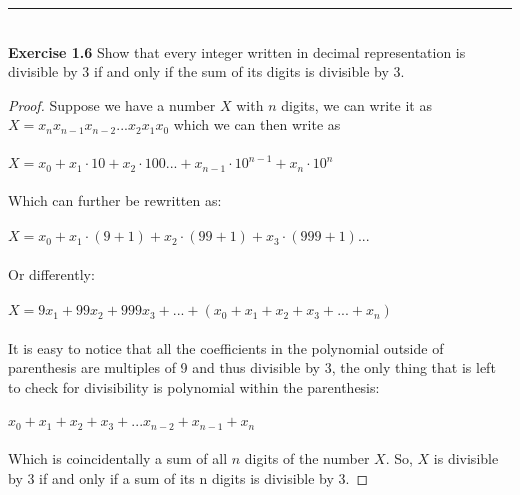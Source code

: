\documentclass{article}
\begin{document}
\noindent\rule{12cm}{0.4pt}\\
\noindent \textbf{Exercise 1.6} Show that every integer written in decimal representation is divisible by 3 if and only if the sum of its digits is divisible by 3.
\begin{proof}
Suppose we have a number $X$ with $n$ digits, we can write it as $X=x_n x_{n-1}x_{n-2}...x_2x_1x_0$ which we can then write as \\\\
 $X=x_0+x_1 \cdot 10 + x_2 \cdot 100 ... + x_{n-1} \cdot 10^{n-1} + x_n \cdot 10^n$ \\\\
 Which can further be rewritten as: \\\\
 $X = x_0 + x_1 \cdot (9 + 1) + x_2 \cdot (99 + 1) + x_3 \cdot (999 + 1)...$\\\\
 Or differently: \\\\
 $X = 9x_1 + 99x_2 + 999x_3 + ... + (x_0 + x_1 + x_2 + x_3 + ... + x_n)$ \\\\
 It is easy to notice that all the coefficients in the polynomial outside of parenthesis are multiples of 9 and thus divisible by 3, the only thing that is left to check for divisibility is polynomial within the parenthesis: \\\\
 $ x_0 + x_1 + x_2 + x_3 + ... x_{n-2} + x_{n-1} + x_n$ \\\\
 Which is coincidentally a sum of all $n$ digits of the number $X$. So, $X$ is divisible by 3 if and only if a sum of its n digits is divisible by 3. 
\end{proof}
\end{document}
